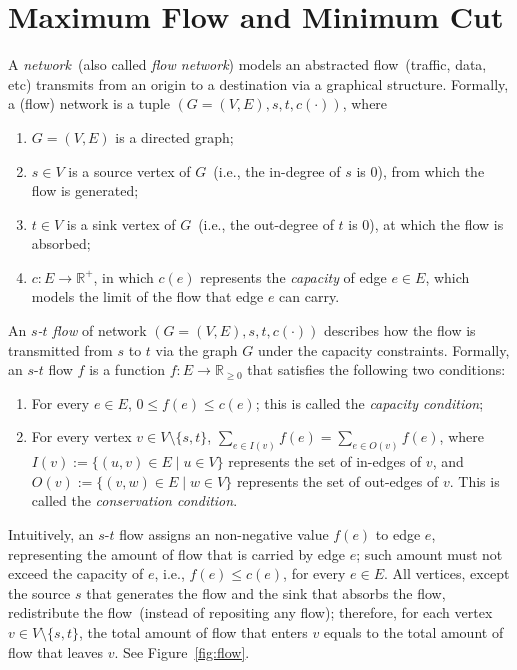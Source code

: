 \setcounter{definition}{0} \setcounter{property}{0} \setcounter{claim}{0} \setcounter{fact}{0} \setcounter{corollary}{0} \setcounter{figure}{0}
\section{Maximum Flow and Minimum Cut}


A \emph{network}~(also called \emph{flow network}) models 
an abstracted flow~(traffic, data, etc) transmits from an origin to a destination
via a graphical structure. Formally, a (flow) network is a tuple $(G = (V, E), s, t, c(\cdot))$, where

\begin{enumerate}
\item $G = (V, E)$ is a directed graph;
\item $s\in V$ is a source vertex of $G$~(i.e., the in-degree of $s$ is 0), from which the flow is generated;
\item $t\in V$ is a sink vertex of $G$~(i.e., the out-degree of $t$ is 0), at which the flow is absorbed;
\item $c: E\to \mathbb{R}^+$, in which $c(e)$ represents the \emph{capacity} of edge $e\in E$, which models the limit of the flow that edge $e$ can carry.
\end{enumerate}

An \emph{$s$-$t$ flow} of network $(G = (V, E), s, t, c(\cdot))$
describes {how} the flow is transmitted from $s$ to $t$
via the graph $G$ under the capacity constraints. Formally,
an $s$-$t$ flow $f$ is a function $f: E\to \mathbb{R}_{\ge 0}$
that satisfies the following two conditions:
\begin{enumerate}
\item For every $e\in E$, $0\le f(e) \le c(e)$; this is called the \emph{capacity condition};
\item For every vertex $v\in V\setminus\{s,t\}$, $\sum_{e\in I(v)} f(e) = \sum_{e\in O(v)} f(e)$, where $I(v) := \{(u,v)\in E\mid u\in V\}$ represents
the set of in-edges of $v$, and $O(v) := \{(v,w)\in E\mid w\in V\}$ represents
the set of out-edges of $v$. This is called the \emph{conservation condition}.
\end{enumerate}

Intuitively, an $s$-$t$ flow assigns an non-negative value $f(e)$ to edge $e$, representing the
amount of flow that is carried by edge $e$; such amount must not exceed the capacity of $e$, i.e., $f(e) \le c(e)$, for every $e\in E$.
All vertices, except the source $s$ that generates the flow and the sink that absorbs the flow,
redistribute the flow~(instead of repositing any flow); therefore, for each vertex $v\in V\setminus\{s,t\}$,
the total amount of flow that enters $v$ equals to the total amount of flow that leaves $v$.
See Figure~\ref{fig:flow}.

